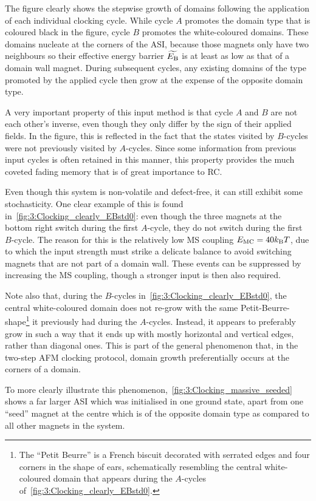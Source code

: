 The figure clearly shows the stepwise growth of domains following the application of each individual clocking cycle.
While cycle $A$ promotes the domain type that is coloured black in the figure, cycle $B$ promotes the white-coloured domains.
These domains nucleate at the corners of the ASI, because those magnets only have two neighbours so their effective energy barrier $\widetilde{E_\mathrm{B}}$ is at least as low as that of a domain wall magnet.
During subsequent cycles, any existing domains of the type promoted by the applied cycle then grow at the expense of the opposite domain type. \par
A very important property of this input method is that cycle $A$ and $B$ are not each other's inverse, even though they only differ by the sign of their applied fields.
In the figure, this is reflected in the fact that the states visited by $B$-cycles were not previously visited by $A$-cycles.
Since some information from previous input cycles is often retained in this manner, this property provides the much coveted fading memory that is of great importance to RC. \par
Even though this system is non-volatile and defect-free, it can still exhibit some stochasticity.
One clear example of this is found in~\cref{fig:3:Clocking_clearly_EBstd0}: even though the three magnets at the bottom right switch during the first $A$-cycle, they do not switch during the first $B$-cycle.
The reason for this is the relatively low MS coupling $\EMC=40\kBT$, due to which the input strength must strike a delicate balance to avoid switching magnets that are not part of a domain wall.
These events can be suppressed by increasing the MS coupling, though a stronger input is then also required. \par %

Note also that, during the $B$-cycles in~\cref{fig:3:Clocking_clearly_EBstd0}, the central white-coloured domain does not re-grow with the same Petit-Beurre-shape\footnote{
	The ``Petit Beurre'' is a French biscuit decorated with serrated edges and four corners in the shape of ears, schematically resembling the central white-coloured domain that appears during the $A$-cycles of~\cref{fig:3:Clocking_clearly_EBstd0}.
} it previously had during the $A$-cycles.
Instead, it appears to preferably grow in such a way that it ends up with mostly horizontal and vertical edges, rather than diagonal ones.
This is part of the general phenomenon that, in the two-step AFM clocking protocol, domain growth preferentially occurs at the corners of a domain. \par
To more clearly illustrate this phenomenon,~\cref{fig:3:Clocking_massive_seeded} shows a far larger ASI which was initialised in one ground state, apart from one ``seed'' magnet at the centre which is of the opposite domain type as compared to all other magnets in the system.

